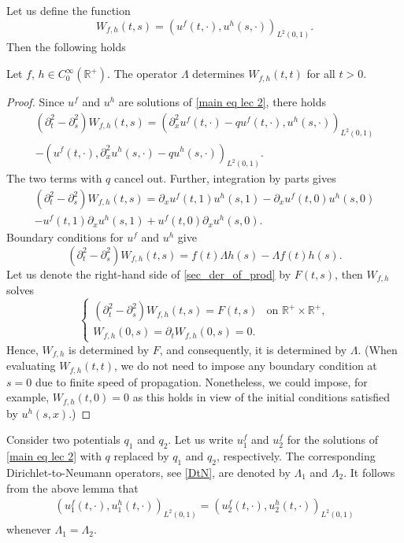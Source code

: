 \documentclass[12pt,oneside,final]{amsart}
\def\R{\mathbb R}
\begin{document}
Let us define the function
\begin{equation*}
	W_{f,h}(t,s) = (u^f(t,\cdot), u^h(s,\cdot) )_{L^2(0,1)}.
\end{equation*} 
Then the following holds
\begin{lemma}\label{scalar lec2}
	Let $f$, $h\in C_0^\infty(\R^+)$. The operator $\Lambda$ determines $W_{f,h}(t,t)$ for all $t>0$.
\end{lemma}
\begin{proof}
	Since $u^f$ and $u^h$ are solutions of \eqref{main eq lec 2}, there holds
	\begin{multline*}
		(\partial_t^2 - \partial_s^2) W_{f,h}(t,s) = \left( \partial_x^2 u^{f}(t,\cdot) - q u^f(t,\cdot), u^{h}(s,\cdot) \right)_{L^2(0,1)}\\
		- \left( u^{f}(t,\cdot), \partial_x^2 u^{h}(s,\cdot) - q u^h(s,\cdot) \right)_{L^2(0,1)}.
	\end{multline*}
The two terms with $q$ cancel out. 
	Further, integration by parts gives 
	\begin{multline*}
		(\partial_t^2 - \partial_s^2) W_{f,h}(t,s)  = \partial_xu^f(t,1) u^h(s,1) -  \partial_xu^f(t,0) u^h(s,0)\\
		-  u^f(t,1) \partial_xu^h(s,1) +  u^f(t,0) \partial_x u^h(s,0).
	\end{multline*}
	Boundary conditions for $u^f$ and $u^h$ give
	\begin{equation}\label{sec_der_of_prod}
		(\partial_t^2 - \partial_s^2)W_{f,h}(t,s) = f(t) \Lambda h(s) - \Lambda f(t) h(s).
	\end{equation}
	Let us denote the right-hand side of \eqref{sec_der_of_prod} by $F(t,s)$, then $W_{f,h}$ solves
	\begin{equation*}
		\begin{cases}
			(\partial_t^2 - \partial_s^2) W_{f,h}(t,s) = F(t,s) & \text{on } \R^+ \times \R^+,\\
			W_{f,h}(0,s) = \partial_tW_{f,h}(0,s) = 0.
		\end{cases}
	\end{equation*}
	Hence, $W_{f,h}$ is determined by $F$, and consequently, it is determined by $\Lambda$. 
(When evaluating $W_{f,h}(t,t)$, we do not need to impose any boundary condition at $s=0$ due to finite speed of propagation. Nonetheless, we could impose, for example, $W_{f,h}(t,0) = 0$ as this holds in view of the initial conditions satisfied by $u^h(s,x)$.)
\end{proof}

Consider two potentials $q_1$ and $q_2$. Let us write $u_1^f$ and $u_2^f$ for the solutions of \eqref{main eq lec 2} with $q$ replaced by $q_1$ and $q_2$, respectively. The corresponding Dirichlet-to-Neumann operators, see \eqref{DtN}, are denoted by $\Lambda_1$ and $\Lambda_2$. 
It follows from the above lemma that 
	\begin{align*}
(u_1^f(t,\cdot), u_1^h(t,\cdot) )_{L^2(0,1)}
= 
(u_2^f(t,\cdot), u_2^h(t,\cdot) )_{L^2(0,1)}
	\end{align*}
whenever $\Lambda_1 = \Lambda_2$.
\end{document}
